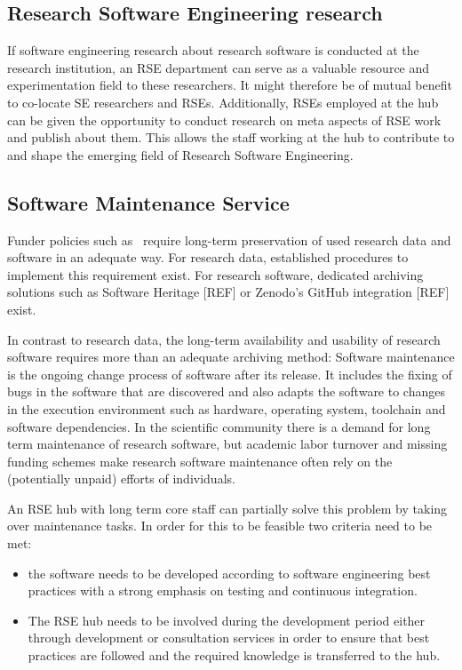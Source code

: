 \documentclass{article}
\begin{document}
\subsection{Research Software Engineering research}

If software engineering research about research software is conducted at the research institution, an RSE department can serve as a valuable resource and experimentation field to these researchers. It might therefore be of mutual benefit to co-locate SE researchers and RSEs.
Additionally, RSEs employed at the hub can be given the opportunity to conduct research on meta aspects of RSE work and publish about them.
This allows the staff working at the hub to contribute to and shape the emerging field of Research Software Engineering.

\subsection{Software Maintenance Service}

Funder policies such as~\autocite{dfg_gsp} require long-term preservation of used research data and software in an adequate way.
For research data, established procedures to implement this requirement exist.
For research software, dedicated archiving solutions such as Software Heritage [REF] or Zenodo's GitHub integration [REF] exist.

In contrast to research data, the long-term availability and usability of research software requires more than an adequate archiving method:
Software maintenance is the ongoing change process of software after its release.
It includes the fixing of bugs in the software that are discovered and also adapts the software to changes in the execution environment such as hardware, operating system, toolchain and software dependencies. In the scientific community there is a demand for long term maintenance of research software, but academic labor turnover and missing funding schemes make research software maintenance often rely on the (potentially unpaid) efforts of individuals.

An RSE hub with long term core staff can partially solve this problem by taking over maintenance tasks.
In order for this to be feasible two criteria need to be met:
\begin{itemize}
\item the software needs to be developed according to software engineering best practices with a strong emphasis on testing and continuous integration.
\item The RSE hub needs to be involved during the development period either through development or consultation services in order to ensure that best practices are followed and the required knowledge is transferred to the hub.
\end{itemize}
\end{document}
